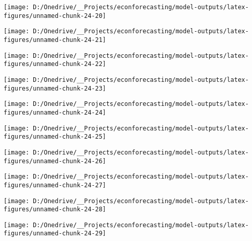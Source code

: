 \documentclass[11pt, letterpaper]{article}\usepackage[]{graphicx}\usepackage[]{color}
\begin{document}
{\centering \texttt{[image: D:/Onedrive/\_\_Projects/econforecasting/model-outputs/latex-figures/unnamed-chunk-24-20]} 

}




{\centering \texttt{[image: D:/Onedrive/\_\_Projects/econforecasting/model-outputs/latex-figures/unnamed-chunk-24-21]} 

}




{\centering \texttt{[image: D:/Onedrive/\_\_Projects/econforecasting/model-outputs/latex-figures/unnamed-chunk-24-22]} 

}




{\centering \texttt{[image: D:/Onedrive/\_\_Projects/econforecasting/model-outputs/latex-figures/unnamed-chunk-24-23]} 

}




{\centering \texttt{[image: D:/Onedrive/\_\_Projects/econforecasting/model-outputs/latex-figures/unnamed-chunk-24-24]} 

}




{\centering \texttt{[image: D:/Onedrive/\_\_Projects/econforecasting/model-outputs/latex-figures/unnamed-chunk-24-25]} 

}




{\centering \texttt{[image: D:/Onedrive/\_\_Projects/econforecasting/model-outputs/latex-figures/unnamed-chunk-24-26]} 

}




{\centering \texttt{[image: D:/Onedrive/\_\_Projects/econforecasting/model-outputs/latex-figures/unnamed-chunk-24-27]} 

}




{\centering \texttt{[image: D:/Onedrive/\_\_Projects/econforecasting/model-outputs/latex-figures/unnamed-chunk-24-28]} 

}




{\centering \texttt{[image: D:/Onedrive/\_\_Projects/econforecasting/model-outputs/latex-figures/unnamed-chunk-24-29]} 

}
\end{document}
